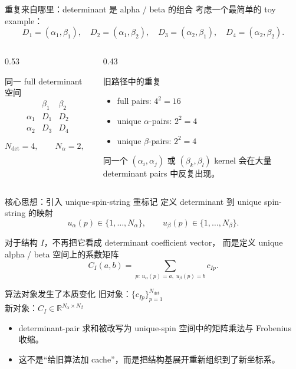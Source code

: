 \documentclass[aspectratio=169,professionalfonts]{ctexbeamer}
\newcommand{\Dfull}{N_{\mathrm{det}}}
\newcommand{\Na}{N_{\alpha}}
\newcommand{\Nb}{N_{\beta}}
\newcommand{\Cmat}{C}
\begin{document}
\begin{frame}{重复来自哪里：determinant 是 alpha / beta 的组合}
  \small
  考虑一个最简单的 toy example：
  \[
  D_1=(\alpha_1,\beta_1),\quad
  D_2=(\alpha_1,\beta_2),\quad
  D_3=(\alpha_2,\beta_1),\quad
  D_4=(\alpha_2,\beta_2).
  \]

  \begin{columns}[T]
    \begin{column}{0.53\textwidth}
      \begin{block}{同一 full determinant 空间}
        \[
        \begin{array}{c|cc}
             & \beta_1 & \beta_2 \\ \hline
          \alpha_1 & D_1 & D_2 \\
          \alpha_2 & D_3 & D_4
        \end{array}
        \]
      \end{block}
      \[
      \Dfull = 4,\qquad \Na = 2,\qquad \Nb = 2.
      \]
    \end{column}
    \begin{column}{0.43\textwidth}
      \begin{block}{旧路径中的重复}
        \begin{itemize}
          \item full pairs: \(4^2 = 16\)
          \item unique \(\alpha\)-pairs: \(2^2 = 4\)
          \item unique \(\beta\)-pairs: \(2^2 = 4\)
        \end{itemize}
      \end{block}
      同一个 \((\alpha_i,\alpha_j)\) 或 \((\beta_k,\beta_l)\) kernel 会在大量 determinant pairs 中反复出现。
    \end{column}
  \end{columns}
\end{frame}

\begin{frame}{核心思想：引入 unique-spin-string 重标记}
  \small
  定义 determinant 到 unique spin-string 的映射
  \[
  u_{\alpha}(p)\in \{1,\dots,\Na\},
  \qquad
  u_{\beta}(p)\in \{1,\dots,\Nb\}.
  \]

  对于结构 \(I\)，不再把它看成 determinant coefficient vector，
  而是定义 unique alpha / beta 空间上的系数矩阵
  \[
  \Cmat_I(a,b)
  =
  \sum_{p:\,u_{\alpha}(p)=a,\;u_{\beta}(p)=b}
  c_{Ip}.
  \]

  \begin{block}{算法对象发生了本质变化}
    旧对象：\(\{c_{Ip}\}_{p=1}^{\Dfull}\) \\
    新对象：\(\Cmat_I \in \mathbb{R}^{\Na \times \Nb}\)
  \end{block}

  \begin{itemize}
    \item determinant-pair 求和被改写为 unique-spin 空间中的矩阵乘法与 Frobenius 收缩。
    \item 这不是“给旧算法加 cache”，而是把结构基展开重新组织到了新坐标系。
  \end{itemize}
\end{frame}
\end{document}
